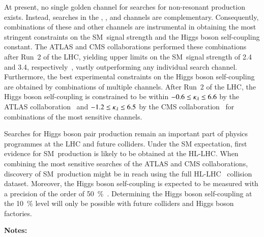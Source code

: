 At present, no single golden channel for searches for non-resonant \HH
production exists. Instead, searches in the \bbbb, \bbtautau, and \bbyy channels
are complementary. Consequently, combinations of these and other channels are
instrumental in obtaining the most stringent constraints on the SM~\HH signal
strength and the Higgs boson self-coupling constant. The ATLAS and CMS
collaborations performed these combinations after Run~2 of the LHC, yielding
upper limits on the SM~\HH signal strength of 2.4 and 3.4,
respectively~\cite{HDBS-2022-03,CMS-HIG-22-001}, vastly outperforming any
individual search channel. Furthermore, the best experimental constraints on the
Higgs boson self-coupling are obtained by combinations of multiple channels.
After Run~2 of the LHC, the Higgs boson self-coupling is constrained to be
within $-0.6 \leq \kappa_{\lambda} \leq 6.6$ by the ATLAS
collaboration~\cite{HDBS-2022-03} and $-1.2 \leq \kappa_{\lambda} \leq 6.5$ by the CMS
collaboration~\cite{CMS-HIG-22-001} for combinations of the most sensitive
channels.


Searches for Higgs boson pair production remain an important part of physics
programmes at the LHC and future colliders. Under the SM expectation, first
evidence for SM~\HH production is likely to be obtained at the HL-LHC. When
combining the most sensitive searches of the ATLAS and CMS collaborations,
discovery of SM~\HH production might be in reach using the full HL-LHC
\pp~collision dataset. Moreover, the Higgs boson self-coupling is expected to be
measured with a precision of the order of
\SI{50}{\percent}~\cite{DiMicco:2019ngk}. Determining the Higgs boson
self-coupling at the \SI{10}{\percent} level will only be possible with future
colliders and Higgs boson factories.


\newpage\noindent\textbf{Notes:}\\









